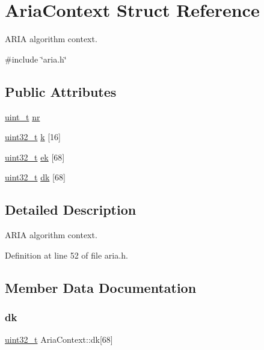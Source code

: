 \hypertarget{structAriaContext}{}\section{Aria\+Context Struct Reference}
\label{structAriaContext}


A\+R\+IA algorithm context.  




{\ttfamily \#include \char`\"{}aria.\+h\char`\"{}}

\subsection*{Public Attributes}
\begin{DoxyCompactItemize}
\item 
\hyperlink{compiler__port_8h_a12a1e9b3ce141648783a82445d02b58d}{uint\+\_\+t} \hyperlink{structAriaContext_a268fb9eff01c611d5e52da435422a329}{nr}
\item 
\hyperlink{stdint_8h_a435d1572bf3f880d55459d9805097f62}{uint32\+\_\+t} \hyperlink{structAriaContext_a0fe6702fab1850816badc2887de388a2}{k} \mbox{[}16\mbox{]}
\item 
\hyperlink{stdint_8h_a435d1572bf3f880d55459d9805097f62}{uint32\+\_\+t} \hyperlink{structAriaContext_a4950c0459aaff6fbcb5b64161f4185bf}{ek} \mbox{[}68\mbox{]}
\item 
\hyperlink{stdint_8h_a435d1572bf3f880d55459d9805097f62}{uint32\+\_\+t} \hyperlink{structAriaContext_a81471d818f7b8f7423d35cf8587bfcbe}{dk} \mbox{[}68\mbox{]}
\end{DoxyCompactItemize}


\subsection{Detailed Description}
A\+R\+IA algorithm context. 

Definition at line 52 of file aria.\+h.



\subsection{Member Data Documentation}
\mbox{\label{structAriaContext_a81471d818f7b8f7423d35cf8587bfcbe}} 
\subsubsection{\texorpdfstring{dk}{dk}}
{\footnotesize\ttfamily \hyperlink{stdint_8h_a435d1572bf3f880d55459d9805097f62}{uint32\+\_\+t} Aria\+Context\+::dk\mbox{[}68\mbox{]}}



